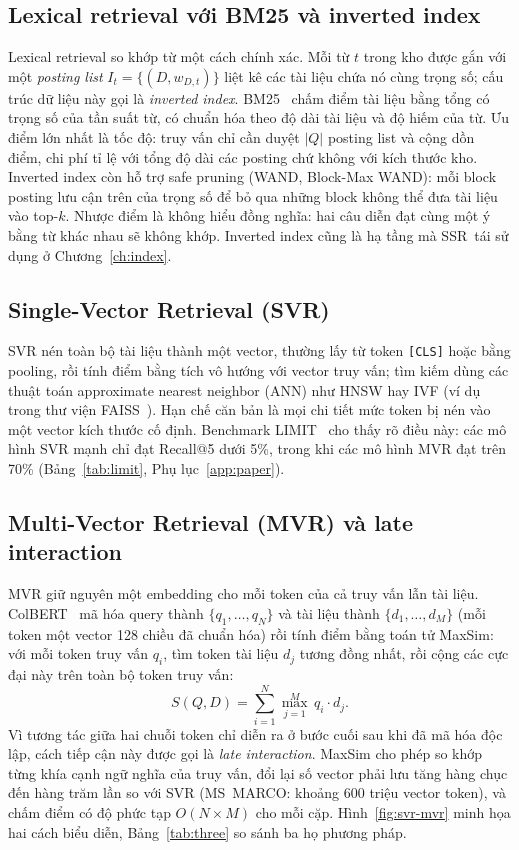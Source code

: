 \documentclass[a4paper,13pt]{extreport}
\theoremstyle{plain}
\newcommand{\ssr}{SSR}
\begin{document}
\subsection{Lexical retrieval với BM25 và inverted index}
Lexical retrieval so khớp từ một cách chính xác. Mỗi từ $t$ trong kho được gắn với một \emph{posting list} $I_t=\{(D,w_{D,t})\}$ liệt kê các tài liệu chứa nó cùng trọng số; cấu trúc dữ liệu này gọi là \emph{inverted index}. BM25~\cite{robertson1995} chấm điểm tài liệu bằng tổng có trọng số của tần suất từ, có chuẩn hóa theo độ dài tài liệu và độ hiếm của từ. Ưu điểm lớn nhất là tốc độ: truy vấn chỉ cần duyệt $|Q|$ posting list và cộng dồn điểm, chi phí tỉ lệ với tổng độ dài các posting chứ không với kích thước kho. Inverted index còn hỗ trợ safe pruning (WAND, Block-Max WAND): mỗi block posting lưu cận trên của trọng số để bỏ qua những block không thể đưa tài liệu vào top-$k$. Nhược điểm là không hiểu đồng nghĩa: hai câu diễn đạt cùng một ý bằng từ khác nhau sẽ không khớp. Inverted index cũng là hạ tầng mà \ssr\ tái sử dụng ở Chương~\ref{ch:index}.

\subsection{Single-Vector Retrieval (SVR)}
SVR nén toàn bộ tài liệu thành một vector, thường lấy từ token \texttt{[CLS]} hoặc bằng pooling, rồi tính điểm bằng tích vô hướng với vector truy vấn; tìm kiếm dùng các thuật toán approximate nearest neighbor (ANN) như HNSW hay IVF (ví dụ trong thư viện FAISS~\cite{douze2024}). Hạn chế căn bản là mọi chi tiết mức token bị nén vào một vector kích thước cố định. Benchmark LIMIT~\cite{weller2025} cho thấy rõ điều này: các mô hình SVR mạnh chỉ đạt Recall@5 dưới 5\%, trong khi các mô hình MVR đạt trên 70\% (Bảng~\ref{tab:limit}, Phụ lục~\ref{app:paper}).

\subsection{Multi-Vector Retrieval (MVR) và late interaction}
MVR giữ nguyên một embedding cho mỗi token của cả truy vấn lẫn tài liệu. ColBERT~\cite{khattab2020} mã hóa query thành $\{q_1,\dots,q_N\}$ và tài liệu thành $\{d_1,\dots,d_M\}$ (mỗi token một vector 128 chiều đã chuẩn hóa) rồi tính điểm bằng toán tử MaxSim: với mỗi token truy vấn $q_i$, tìm token tài liệu $d_j$ tương đồng nhất, rồi cộng các cực đại này trên toàn bộ token truy vấn:
\begin{equation}
S(Q,D)=\sum_{i=1}^{N}\max_{j=1}^{M}\, q_i\cdot d_j .
\label{eq:maxsim}
\end{equation}
Vì tương tác giữa hai chuỗi token chỉ diễn ra ở bước cuối sau khi đã mã hóa độc lập, cách tiếp cận này được gọi là \emph{late interaction}. MaxSim cho phép so khớp từng khía cạnh ngữ nghĩa của truy vấn, đổi lại số vector phải lưu tăng hàng chục đến hàng trăm lần so với SVR (MS~MARCO: khoảng 600 triệu vector token), và chấm điểm có độ phức tạp $O(N\times M)$ cho mỗi cặp. Hình~\ref{fig:svr-mvr} minh họa hai cách biểu diễn, Bảng~\ref{tab:three} so sánh ba họ phương pháp.
\end{document}
